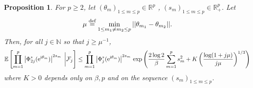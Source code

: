 \documentclass[]{article}
\newtheorem{prop}[thm]{Proposition}
\begin{document}
\begin{prop} \label{boundconditionalmomentsdoubling}
For $p \geq 2$, let $(\theta_m)_{1 \leq m \leq p}\in \mathbb{R}^p$ , $(s_m)_{1 \leq m \leq p}\in \mathbb{R}_+^p$. 
Let 
$$\mu \overset{\textnormal{def}}{=} \min_{1 \leq m_1 \neq m_2 \leq p} 
||\theta_{m_1} - \theta_{m_2}||.$$
Then, for all $j\in \mathbb{N}$ so that $j \geq \mu^{-1}$, 
$$\mathbb{E} \left[ \prod_{m=1}^p \left|\Phi^*_{2j} (\mathrm{e}^{\textnormal{i} \theta_m})\right|^{2s_m} \;  \bigg| \mathcal{F}_j \right]
\leq \prod_{m=1}^p \left|\Phi^*_{j} (\mathrm{e}^{\textnormal{i} \theta_m})
\right|^{2s_m} \, \exp \left(
\frac{2 \log 2}{\beta}  
 \sum_{m=1}^{p} s_m^2 
+ K \left( \frac{\log (1 + j \mu)}{j \mu} \right)^{1/3} \right)
$$
where $K > 0$ depends only on $\beta, p$
and on the sequence $(s_m)_{1 \leq m \leq p}$. 
\end{prop}
\end{document}
